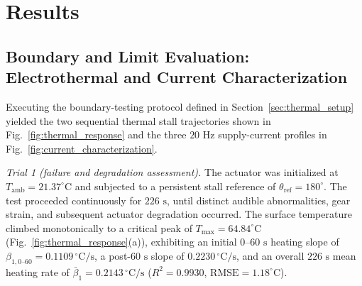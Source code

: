 \documentclass[lettersize,journal]{IEEEtran}
\begin{document}
	\section{Results}
	\label{sec:results}
	
	\subsection{Boundary and Limit Evaluation: Electrothermal and Current Characterization}
	\label{sec:thermal_experiment}
	
	Executing the boundary-testing protocol defined in Section~\ref{sec:thermal_setup} yielded the two sequential thermal stall trajectories shown in Fig.~\ref{fig:thermal_response} and the three $20\text{ Hz}$ supply-current profiles in Fig.~\ref{fig:current_characterization}.
	
	\textit{Trial 1 (failure and degradation assessment).} The actuator was initialized at $T_{\text{amb}} = 21.37^\circ\text{C}$ and subjected to a persistent stall reference of $\theta_{\text{ref}} = 180^\circ$. The test proceeded continuously for $226\text{ s}$, until distinct audible abnormalities, gear strain, and subsequent actuator degradation occurred. The surface temperature climbed monotonically to a critical peak of $T_{\max} = 64.84^\circ\text{C}$ (Fig.~\ref{fig:thermal_response}(a)), exhibiting an initial $0\text{--}60\text{ s}$ heating slope of $\beta_{1,0\text{--}60} = 0.1109\,^\circ\text{C/s}$, a post-$60\text{ s}$ slope of $0.2230\,^\circ\text{C/s}$, and an overall $226\text{ s}$ mean heating rate of $\bar{\beta}_1 = 0.2143\,^\circ\text{C/s}$ ($R^2 = 0.9930$, $\text{RMSE} = 1.18^\circ\text{C}$).
	
\end{document}
